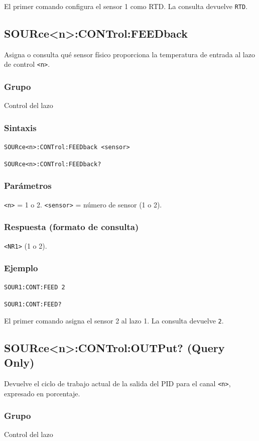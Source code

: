 El primer comando configura el sensor 1 como RTD. La consulta devuelve
\texttt{RTD}.

\subsection*{SOURce<n>:CONTrol:FEEDback}

Asigna o consulta qué sensor físico proporciona la temperatura de entrada
al lazo de control \texttt{<n>}.

\subsubsection*{Grupo}
Control del lazo

\subsubsection*{Sintaxis}
\texttt{SOURce<n>:CONTrol:FEEDback <sensor>}\par
\texttt{SOURce<n>:CONTrol:FEEDback?}

\subsubsection*{Parámetros}
\texttt{<n>} = 1 o 2. \texttt{<sensor>} = número de sensor (1 o 2).

\subsubsection*{Respuesta (formato de consulta)}
\texttt{<NR1>} (1 o 2).

\subsubsection*{Ejemplo}
\texttt{SOUR1:CONT:FEED 2}\par
\texttt{SOUR1:CONT:FEED?}

El primer comando asigna el sensor 2 al lazo 1. La consulta devuelve
\texttt{2}.

\subsection*{SOURce<n>:CONTrol:OUTPut? (Query Only)}

Devuelve el ciclo de trabajo actual de la salida del PID para el canal
\texttt{<n>}, expresado en porcentaje.

\subsubsection*{Grupo}
Control del lazo

